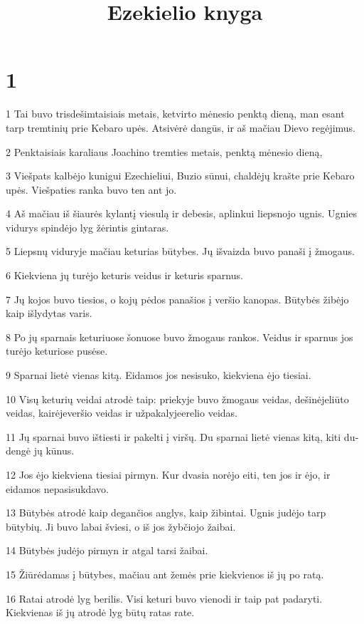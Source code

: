 

\title{Ezekielio knyga}

\chapter{1}


\par 1 Tai buvo trisdešimtaisiais metais, ketvirto mėnesio penktą dieną, man esant tarp tremtinių prie Kebaro upės. Atsivėrė dangūs, ir aš mačiau Dievo regėjimus. 
\par 2 Penktaisiais karaliaus Joachino tremties metais, penktą mėnesio dieną, 
\par 3 Viešpats kalbėjo kunigui Ezechieliui, Buzio sūnui, chaldėjų krašte prie Kebaro upės. Viešpaties ranka buvo ten ant jo. 
\par 4 Aš mačiau iš šiaurės kylantį viesulą ir debesis, aplinkui liepsnojo ugnis. Ugnies vidurys spindėjo lyg žėrintis gintaras. 
\par 5 Liepsnų viduryje mačiau keturias būtybes. Jų išvaizda buvo panaši į žmogaus. 
\par 6 Kiekviena jų turėjo keturis veidus ir keturis sparnus. 
\par 7 Jų kojos buvo tiesios, o kojų pėdos panašios į veršio kanopas. Būtybės žibėjo kaip išlydytas varis. 
\par 8 Po jų sparnais keturiuose šonuose buvo žmogaus rankos. Veidus ir sparnus jos turėjo keturiose pusėse. 
\par 9 Sparnai lietė vienas kitą. Eidamos jos nesisuko, kiekviena ėjo tiesiai. 
\par 10 Visų keturių veidai atrodė taip: priekyje buvo žmogaus veidas, dešinėje­liūto veidas, kairėje­veršio veidas ir užpakalyje­erelio veidas. 
\par 11 Jų sparnai buvo ištiesti ir pakelti į viršų. Du sparnai lietė vienas kitą, kiti du­dengė jų kūnus. 
\par 12 Jos ėjo kiekviena tiesiai pirmyn. Kur dvasia norėjo eiti, ten jos ir ėjo, ir eidamos nepasisukdavo. 
\par 13 Būtybės atrodė kaip degančios anglys, kaip žibintai. Ugnis judėjo tarp būtybių. Ji buvo labai šviesi, o iš jos žybčiojo žaibai. 
\par 14 Būtybės judėjo pirmyn ir atgal tarsi žaibai. 
\par 15 Žiūrėdamas į būtybes, mačiau ant žemės prie kiekvienos iš jų po ratą. 
\par 16 Ratai atrodė lyg berilis. Visi keturi buvo vienodi ir taip pat padaryti. Kiekvienas iš jų atrodė lyg būtų ratas rate. 

